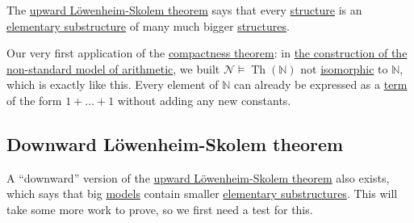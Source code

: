 \begin{intuition}
	The \hyperref[thm:upward-Lowenheim-Skolem]{upward Löwenheim-Skolem theorem} says that every \hyperref[def:structure]{structure} is an \hyperref[def:elementary-substructure]{elementary substructure} of many much bigger \hyperref[def:structure]{structures}.
\end{intuition}

\begin{prev}
	Our very first application of the \hyperref[thm:compactness]{compactness theorem}: in \hyperref[eg:construction-non-standard-model-of-arithmetic]{the construction of the non-standard model of arithmetic}, we built \(\mathcal{N} \models \mathop{\mathrm{Th}}(\mathbb{N} ) \) not \hyperref[def:isomorphism]{isomorphic} to \(\mathbb{N} \), which is exactly like this. Every element of \(\mathbb{N} \) can already be expressed as a \hyperref[def:term]{term} of the form \(1+\ldots +1\) without adding any new constants.
\end{prev}

\subsection{Downward Löwenheim-Skolem theorem}
A ``downward'' version of the \hyperref[thm:upward-Lowenheim-Skolem]{upward Löwenheim-Skolem theorem} also exists, which says that big \hyperref[def:model]{models} contain smaller \hyperref[def:elementary-substructure]{elementary substructures}. This will take some more work to prove, so we first need a test for this.

